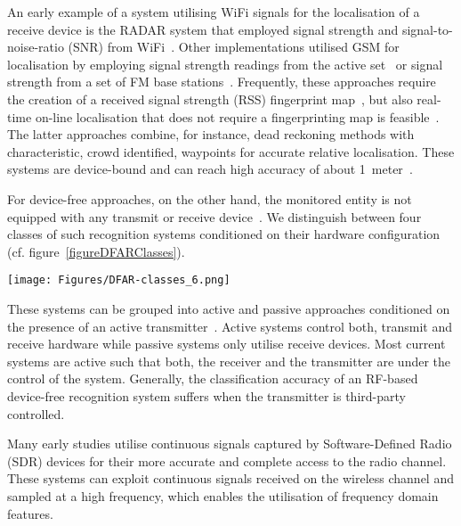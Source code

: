 \documentclass[journal]{IEEEtran}
\begin{document}
\begin{figure*}
An early example of a system utilising WiFi signals for the localisation of a receive device is the RADAR system that employed signal strength and signal-to-noise-ratio (SNR) from WiFi~\cite{Pervasive_Bahl_2000}.
Other implementations utilised GSM for localisation by employing signal strength readings from the active set~\cite{Pervasive_Otsason_2005,Pervasive_Varshavsky_2007} or signal strength from a set of FM base stations~\cite{Pervasive_Krumm_2003,Pervasive_Youssef_2005}.
Frequently, these approaches require the creation of a received signal strength (RSS) fingerprint map~\cite{Pervasive_Jiang_2012,Pervasive_Pulkkinen_2012,DeviceFreeRecognition_Aly_2013}, but also real-time on-line localisation that does not require a fingerprinting map is feasible~\cite{Pervasive_Schougaard_2012,Pervasive_Wang_2012,Pervasive_Chen_2012,Pervasive_Chen_2012b,Pervasive_Chen_2012-2}. 
The latter approaches combine, for instance, dead reckoning methods with characteristic, crowd identified, waypoints for accurate relative localisation.
These systems are device-bound and can reach high accuracy of about 1~meter~\cite{RFSensing_Sen_2012}.

For device-free approaches, on the other hand, the monitored entity is not equipped with any transmit or receive device~\cite{Pervasive_Youssef_2007}.
We distinguish between four classes of such recognition systems conditioned on their hardware configuration (cf. figure~\ref{figureDFARClasses}).
\begin{figure*}
\texttt{[image: Figures/DFAR-classes\_6.png]}
\caption{RF-based device-free activity recognition systems and their recognition capabilities and system configuration considered. The figure groups related the corresponding reference to reach system under the respective class. }
\label{figureDFARClasses}
\end{figure*}
These systems can be grouped into active and passive approaches conditioned on the presence of an active transmitter~\cite{Pervasive_Scholz_2011b}.
Active systems control both, transmit and receive hardware while passive systems only utilise receive devices. 
Most current systems are active such that both, the receiver and the transmitter are under the control of the system.
Generally, the classification accuracy of an RF-based device-free recognition system suffers when the transmitter is third-party controlled.

Many early studies utilise continuous signals captured by Software-Defined Radio (SDR) devices for their more accurate and complete access to the radio channel. 
These systems can exploit continuous signals received on the wireless channel and sampled at a high frequency, which enables the utilisation of frequency domain features.


\end{figure*}
\end{document}
